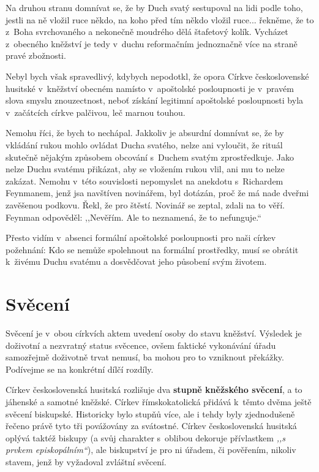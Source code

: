 Na druhou stranu domnívat se, že by Duch svatý sestupoval na lidi podle toho,
jestli na ně vložil ruce někdo, na koho před tím někdo vložil ruce... řekněme,
že to z~Boha svrchovaného a nekonečně moudrého dělá štafetový kolík. Vycházet
z~obecného kněžství je tedy v~duchu reformačním jednoznačně více na straně pravé
zbožnosti.

Nebyl bych však spravedlivý, kdybych nepodotkl, že opora Církve československé
husitské v~kněžství obecném namísto v~apoštolské posloupnosti je v~pravém slova
smyslu znouzectnost, neboť získání legitimní apoštolské posloupnosti
byla v~začátcích církve palčivou, leč marnou touhou.

Nemohu říci, že bych to nechápal. Jakkoliv je absurdní domnívat se, že by
vkládání rukou mohlo ovládat Ducha svatého, nelze ani vyloučit, že rituál
skutečně nějakým způsobem obcování s~Duchem svatým zprostředkuje. Jako nelze
Duchu svatému přikázat, aby se vložením rukou vlil, ani mu to nelze zakázat.
Nemohu v~této souvislosti nepomyslet na anekdotu s~Richardem Feynmanem, jenž jsa
navštíven novinářem, byl dotázán, proč že má nade dveřmi zavěšenou podkovu.
Řekl, že pro štěstí. Novinář se zeptal, zdali na to věří. Feynman odpověděl:
,,Nevěřím. Ale to neznamená, že to nefunguje.``

Přesto vidím v~absenci formální apoštolské posloupnosti pro naši církev
požehnání: Kdo se nemůže spolehnout na formální prostředky, musí se obrátit
k~živému Duchu svatému a dosvědčovat jeho působení svým životem.

\chapter{Svěcení}

Svěcení je v~obou církvích aktem uvedení osoby do stavu kněžství. Výsledek je
doživotní a nezvratný status svěcence, ovšem faktické vykonávání úřadu
samozřejmě doživotně trvat nemusí, ba mohou pro to vzniknout překážky.
Podívejme se na konkrétní dílčí rozdíly.

Církev československá husitská rozlišuje dva \textbf{stupně kněžského svěcení},
a to jáhenské a samotné kněžské. Církev římskokatolická přidává k~těmto dvěma
ještě svěcení biskupské. Historicky bylo stupňů více, ale i tehdy byly
zjednodušeně řečeno právě tyto tři povážovány za svátostné. Církev
československá husitská oplývá taktéž biskupy (a svůj charakter s~oblibou
dekoruje přívlastkem \textit{,,s prvkem episkopálním``}), ale biskupství je pro
ni úřadem, či pověřením, nikoliv stavem, jenž by vyžadoval zvláštní svěcení.

